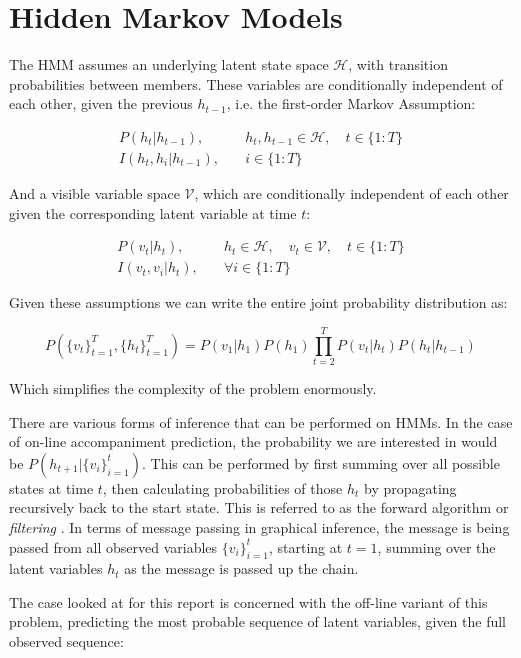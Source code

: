 \documentclass[bsc,singlespacing,logo, parskip, deptreport]{infthesis}
\begin{document}
\section{Hidden Markov Models}

The HMM assumes an underlying latent state space $\mathcal H$, with transition probabilities between members. These variables are conditionally independent of each other, given the previous $h_{t-1}$, i.e. the first-order Markov Assumption:

\begin{align}
  P(h_t | h_{t-1}),& \quad h_t, h_{t-1} \in {\mathcal H}, \quad  t \in \{1:T\} \\
  I(h_t, h_i | h_{t-1}),&  \quad i \in \{1:T\}
\end{align}

And a visible variable space $\mathcal V$, which are conditionally independent of each other given the corresponding latent variable at time $t$:

\begin{align}
  P(v_t | h_t),& \quad h_t \in {\mathcal H}, \quad v_t \in {\mathcal V}, \quad  t \in \{1:T\} \\
  I(v_t, v_i | h_{t}),& \quad \forall i \in \{1:T\}
\end{align}

Given these assumptions we can write the entire joint probability distribution as:

\begin{equation}
  P(\{v_{t}\}^{T}_{t=1}, \{h_{t}\}^{T}_{t=1}) = P(v_1 | h_1) P(h_1) \prod_{t=2}^{T} P(v_t | h_t) P(h_t | h_{t-1})
\end{equation}

Which simplifies the complexity of the problem enormously.

There are various forms of inference that can be performed on HMMs. In the case of on-line accompaniment prediction, the probability we are interested in would be $P(h_{t+1} | \{v_i\}_{i=1}^{t})$. This can be performed by first summing over all possible states at time $t$, then calculating probabilities of those $h_t$ by propagating recursively back to the start state. This is referred to as the forward algorithm or {\em filtering} \cite{russell2002artificial}. In terms of message passing in graphical inference, the message is being passed from all observed variables $\{v_i\}_{i=1}^{t}$, starting at $t=1$, summing over the latent variables $h_t$ as the message is passed up the chain.

The case looked at for this report is concerned with the off-line variant of this problem, predicting the most probable sequence of latent variables, given the full observed sequence:
\end{document}

